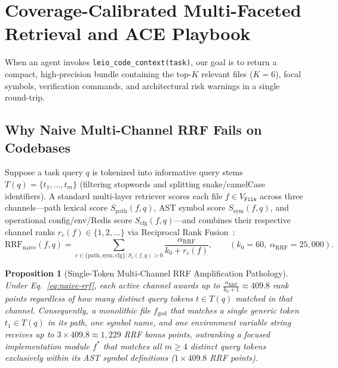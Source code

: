 \documentclass[11pt]{article}
\newtheorem{proposition}{Proposition}
\begin{document}
\section{Coverage-Calibrated Multi-Faceted Retrieval and ACE Playbook}
\label{sec:retrieval}

When an agent invokes \texttt{leio\_code\_context(task)}, our goal is to return a compact, high-precision bundle containing the top-$K$ relevant files ($K=6$), focal symbols, verification commands, and architectural risk warnings in a single round-trip.

\subsection{Why Naive Multi-Channel RRF Fails on Codebases}

Suppose a task query $q$ is tokenized into informative query stems $T(q) = \{t_1, \dots, t_m\}$ (filtering stopwords and splitting snake/camelCase identifiers). A standard multi-layer retriever scores each file $f \in V_{\texttt{File}}$ across three channels—path lexical score $S_{\text{path}}(f, q)$, AST symbol score $S_{\text{sym}}(f, q)$, and operational config/env/Redis score $S_{\text{cfg}}(f, q)$—and combines their respective channel ranks $r_c(f) \in \{1, 2, \dots\}$ via Reciprocal Rank Fusion~\cite{cormack2009reciprocal}:
\begin{equation}
\label{eq:naive-rrf}
\text{RRF}_{\text{naive}}(f, q) = \sum_{c \in \{\text{path}, \text{sym}, \text{cfg}\} : S_c(f, q) > 0} \frac{\alpha_{\text{RRF}}}{k_0 + r_c(f)}, \qquad (k_0 = 60,\; \alpha_{\text{RRF}} = 25{,}000).
\end{equation}

\begin{proposition}[Single-Token Multi-Channel RRF Amplification Pathology]
\label{prop:rrf-pathology}
Under Eq.~\eqref{eq:naive-rrf}, each active channel awards up to $\frac{\alpha_{\text{RRF}}}{k_0 + 1} \approx 409.8$ rank points regardless of how many distinct query tokens $t \in T(q)$ matched in that channel. Consequently, a monolithic file $f_{\text{god}}$ that matches a single generic token $t_1 \in T(q)$ in its path, one symbol name, and one environment variable string receives up to $3 \times 409.8 \approx 1{,}229$ RRF bonus points, outranking a focused implementation module $f^*$ that matches all $m \ge 4$ distinct query tokens exclusively within its AST symbol definitions ($1 \times 409.8$ RRF points).
\end{proposition}
\end{document}
